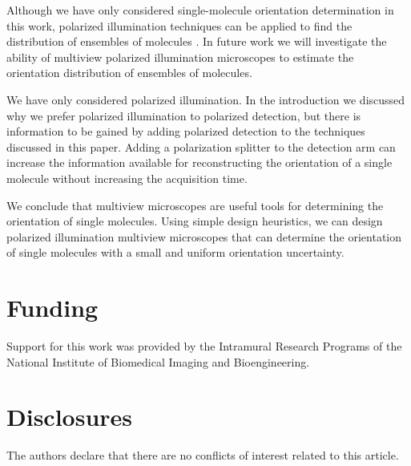 \documentclass[10pt]{article}
\begin{document}
Although we have only considered single-molecule orientation determination in
this work, polarized illumination techniques can be applied to find the
distribution of ensembles of molecules \cite{mehta2016, backer2016}. In future
work we will investigate the ability of multiview polarized illumination
microscopes to estimate the orientation distribution of ensembles of molecules.

We have only considered polarized illumination. In the introduction
we discussed why we prefer polarized illumination to polarized detection, but
there is information to be gained by adding polarized detection to the
techniques discussed in this paper. Adding a polarization splitter to the
detection arm can increase the information available for reconstructing the
orientation of a single molecule without increasing the acquisition time.

We conclude that multiview microscopes are useful tools for determining the
orientation of single molecules. Using simple design heuristics, we can design
polarized illumination multiview microscopes that can determine the orientation
of single molecules with a small and uniform orientation uncertainty.

\section*{Funding}
Support for this work was provided by the Intramural Research Programs of the
National Institute of Biomedical Imaging and Bioengineering.

\section*{Disclosures}
The authors declare that there are no conflicts of interest related to this article.
\end{document}
